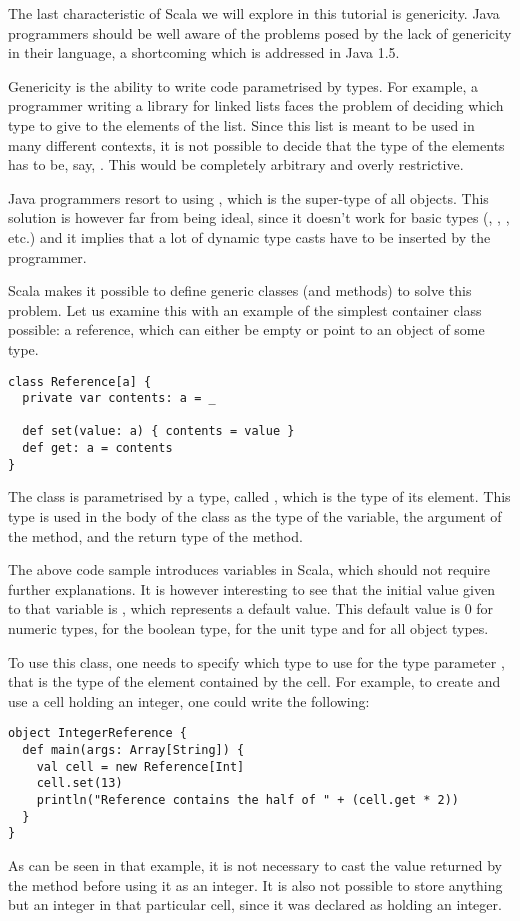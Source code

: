 \documentclass[a4paper,12pt,twoside,titlepage]{article}
\newcommand{\langname}[1]{#1\xspace}
\newcommand{\Scala}{\langname{Scala}}
\newcommand{\Java}{\langname{Java}}
\begin{document}
The last characteristic of \Scala we will explore in this tutorial is
genericity. \Java programmers should be well aware of the problems
posed by the lack of genericity in their language, a shortcoming which
is addressed in \Java 1.5.

Genericity is the ability to write code parametrised by types. For
example, a programmer writing a library for linked lists faces the
problem of deciding which type to give to the elements of the list.
Since this list is meant to be used in many different contexts, it is
not possible to decide that the type of the elements has to be, say,
. This would be completely arbitrary and overly
restrictive.

\Java programmers resort to using , which is the
super-type of all objects. This solution is however far from being
ideal, since it doesn't work for basic types (,
, , etc.) and it implies that a lot of
dynamic type casts have to be inserted by the programmer.

\Scala makes it possible to define generic classes (and methods) to
solve this problem. Let us examine this with an example of the
simplest container class possible: a reference, which can either be
empty or point to an object of some type.
\begin{lstlisting}
class Reference[a] {
  private var contents: a = _

  def set(value: a) { contents = value }
  def get: a = contents
}
\end{lstlisting}
The class  is parametrised by a type, called ,
which is the type of its element. This type is used in the body of the
class as the type of the  variable, the argument of
the  method, and the return type of the  method.

The above code sample introduces variables in \Scala, which should not
require further explanations. It is however interesting to see that
the initial value given to that variable is \code{_}, which represents
a default value. This default value is 0 for numeric types,
 for the boolean type, \code{()} for the unit type and
 for all object types.

To use this  class, one needs to specify which type to use
for the type parameter , that is the type of the element
contained by the cell. For example, to create and use a cell holding
an integer, one could write the following:
\begin{lstlisting}
object IntegerReference {
  def main(args: Array[String]) {
    val cell = new Reference[Int]
    cell.set(13)
    println("Reference contains the half of " + (cell.get * 2))
  }
}
\end{lstlisting}
As can be seen in that example, it is not necessary to cast the value
returned by the  method before using it as an integer. It
is also not possible to store anything but an integer in that
particular cell, since it was declared as holding an integer.
\end{document}
